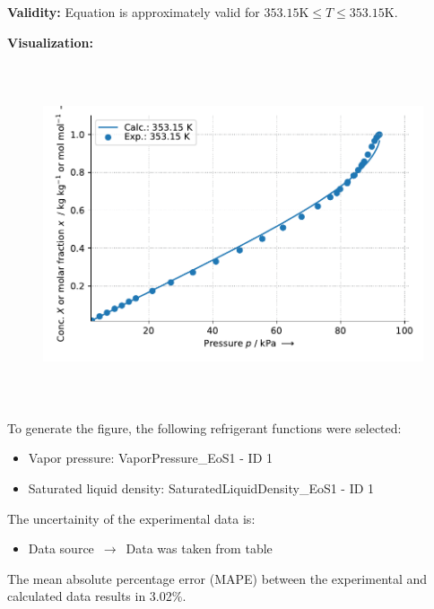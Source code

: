 \textbf{Validity:}
\newline
Equation is approximately valid for $353.15 \si{\kelvin} \leq T \leq 353.15 \si{\kelvin}$.
\newline

\textbf{Visualization:}
%
\begin{figure}[!htp]
{\noindent\includegraphics[height=10cm, keepaspectratio]{figs/abs/abs_2-Propanol_ionic_liquid_[EMIM]+[(CF3SO2)2N]-_WilsonFixedDl_1.pdf}}
\end{figure}
%

To generate the figure, the following refrigerant functions were selected:
\begin{itemize}
\item Vapor pressure: VaporPressure\_EoS1 - ID 1
\item Saturated liquid density: SaturatedLiquidDensity\_EoS1 - ID 1
\end{itemize}

The uncertainity of the experimental data is:
\begin{itemize}
\item Data source $\,\to\,$ Data was taken from table
\end{itemize}

The mean absolute percentage error (MAPE) between the experimental and calculated data results in 3.02\%.
\FloatBarrier
\newpage
